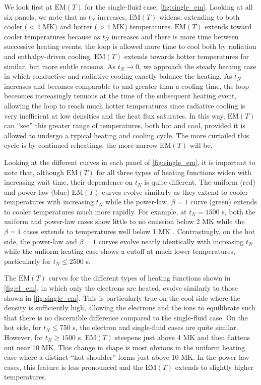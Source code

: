 \documentclass[apj]{emulateapj}
\begin{document}
	\par We look first at $\mathrm{EM}(T)$ for the single-fluid case, \autoref{fig:single_em}. Looking at all six panels, we note that as $t_N$ increases, $\mathrm{EM}(T)$ widens, extending to both cooler ($<4$ MK) and hotter ($>4$ MK) temperatures. $\mathrm{EM}(T)$ extends toward cooler temperatures because as $t_N$ increases and there is more time between successive heating events, the loop is allowed more time to cool both by radiation and enthalpy-driven cooling. $\mathrm{EM}(T)$ extends towards hotter temperatures for similar, but more subtle reasons. As $t_N\to0$, we approach the steady heating case in which conductive and radiative cooling exactly balance the heating. As $t_N$ increases and becomes comparable to and greater than a cooling time, the loop beceomes increasingly tenuous at the time of the subsequent heating event, allowing the loop to reach much hotter temperatures since radiative cooling is very inefficient at low densities and the heat flux saturates. In this way, $\mathrm{EM}(T)$ can ``see'' this greater range of temperatures, both hot and cool, provided it is allowed to undergo a typical heating and cooling cycle. The more curtailed this cycle is by continued reheatings, the more narrow $\mathrm{EM}(T)$ will be.
	\par Looking at the different curves in each panel of \autoref{fig:single_em}, it is important to note that, although $\mathrm{EM}(T)$ for all three types of heating functions widen with increasing wait time, their dependence on $t_N$ is quite different. The uniform (red) and power-law (blue) $\mathrm{EM}(T)$ curves evolve similarly as they extend to cooler temperatures with increasing $t_N$ while the power-law, $\beta=1$ curve (green) extends to cooler temperatures much more rapidly. For example, at $t_N=1500$ s, both the uniform and power-law cases show little to no emission below 2 MK while the $\beta=1$ cases extends to temperatures well below 1 MK \citep{cargill_active_2014}. Contrastingly, on the hot side, the power-law and $\beta=1$ curves evolve nearly identically with increasing $t_N$ while the unfiorm heating case shows a cutoff at much lower temperatures, particularly for $t_N\le2500$ s. 
	\par The $\mathrm{EM}(T)$ curves for the different types of heating functions shown in \autoref{fig:el_em}, in which only the electrons are heated, evolve similarly to those shown in \autoref{fig:single_em}. This is particularly true on the cool side where the density is sufficiently high, allowing the electrons and the ions to equilibrate such that there is no discernible difference compared to the single-fluid case. On the hot side, for $t_N\le750$ s, the electron and single-fluid cases are quite similar. However, for $t_N\ge1500$ s, $\mathrm{EM}(T)$ steepens just above 4 MK and then flattens out near 10 MK. This change in shape is most obvious in the uniform heating case where a distinct ``hot shoulder'' forms just above 10 MK. In the power-law cases, this feature is less pronounced and the $\mathrm{EM}(T)$ extends to slightly higher temperatures.
\end{document}
